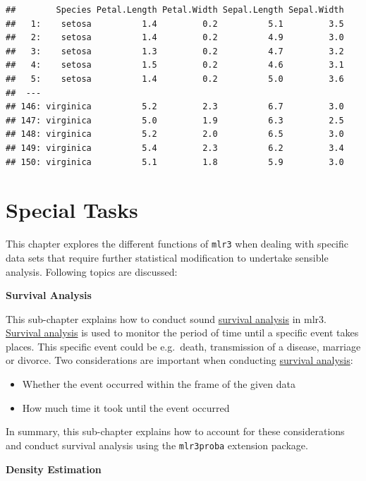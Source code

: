 \documentclass[]{scrbook}
\providecommand{\tightlist}{%
  \setlength{\itemsep}{0pt}\setlength{\parskip}{0pt}}
\begin{document}
\begin{verbatim}
##        Species Petal.Length Petal.Width Sepal.Length Sepal.Width
##   1:    setosa          1.4         0.2          5.1         3.5
##   2:    setosa          1.4         0.2          4.9         3.0
##   3:    setosa          1.3         0.2          4.7         3.2
##   4:    setosa          1.5         0.2          4.6         3.1
##   5:    setosa          1.4         0.2          5.0         3.6
##  ---                                                            
## 146: virginica          5.2         2.3          6.7         3.0
## 147: virginica          5.0         1.9          6.3         2.5
## 148: virginica          5.2         2.0          6.5         3.0
## 149: virginica          5.4         2.3          6.2         3.4
## 150: virginica          5.1         1.8          5.9         3.0
\end{verbatim}

\hypertarget{special-tasks}{%
\chapter{Special Tasks}\label{special-tasks}}

This chapter explores the different functions of \texttt{mlr3} when dealing with specific data sets that require further statistical modification to undertake sensible analysis.
Following topics are discussed:

\textbf{Survival Analysis}

This sub-chapter explains how to conduct sound \protect\hyperlink{survival}{survival analysis} in mlr3.
\protect\hyperlink{survival}{Survival analysis} is used to monitor the period of time until a specific event takes places.
This specific event could be e.g.~death, transmission of a disease, marriage or divorce.
Two considerations are important when conducting \protect\hyperlink{survival}{survival analysis}:

\begin{itemize}
\tightlist
\item
  Whether the event occurred within the frame of the given data
\item
  How much time it took until the event occurred
\end{itemize}

In summary, this sub-chapter explains how to account for these considerations and conduct survival analysis using the \texttt{mlr3proba} extension package.

\textbf{Density Estimation}
\end{document}
